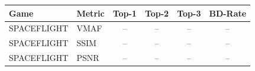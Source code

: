 \begin{tabular}{llcccc}
\toprule
Game & Metric & Top-1 & Top-2 & Top-3 & BD-Rate \\
\midrule
SPACEFLIGHT & VMAF & -- & -- & -- & -- \\
SPACEFLIGHT & SSIM & -- & -- & -- & -- \\
SPACEFLIGHT & PSNR & -- & -- & -- & -- \\
\bottomrule
\end{tabular}
